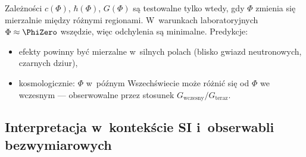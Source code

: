 \begin{problem}\label{prob:stale}
Zale\.zno\'sci $c(\Phi)$, $\hbar(\Phi)$, $G(\Phi)$ s\k{a} testowalne
tylko wtedy, gdy $\Phi$ zmienia si\k{e} mierzalnie mi\k{e}dzy r\'o\.znymi
regionami. W~warunkach laboratoryjnych $\Phi \approx \PhiZero$
wsz\k{e}dzie, wi\k{e}c odchylenia s\k{a} minimalne. Predykcje:
\begin{itemize}[nosep]
  \item efekty powinny by\'c mierzalne w~silnych polach
        (blisko gwiazd neutronowych, czarnych dziur),
  \item kosmologicznie: $\Phi$ w~p\'o\'znym Wszech\'swiecie
        mo\.ze r\'o\.zni\'c si\k{e} od $\Phi$ we wczesnym ---
        obserwowalne przez stosunek $G_{\mathrm{wczesny}}/G_{\mathrm{teraz}}$.
\end{itemize}
\end{problem}

\subsection{Interpretacja w~kontek\'scie SI i~obserwabli bezwymiarowych}%
\label{ssec:si-metrologia}

